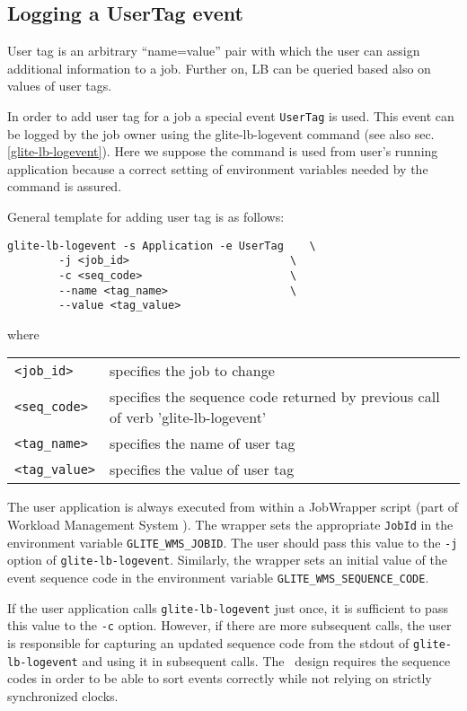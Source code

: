 \subsection{Logging a UserTag event}
\label{log_usertag}

User tag is an arbitrary ``name=value'' pair with which the user can assign
additional information to a job. Further on, LB can be queried based also on
values of user tags.  %

In order to add user tag for a job a special event \verb'UserTag' is used. This
event can be logged by the job owner using the glite-lb-logevent command (see
also sec.\ref{glite-lb-logevent}). Here we suppose the command is used from
user's running application because a correct setting of environment variables
needed by the command is assured.

General template for adding user tag is as follows:

\begin{verbatim}
glite-lb-logevent -s Application -e UserTag    \
        -j <job_id>                         \
        -c <seq_code>                       \
        --name <tag_name>                   \
        --value <tag_value>
\end{verbatim}

where

\begin{tabularx}{\textwidth}{lX}
\verb'<job_id>'    & specifies the job to change \\
\verb'<seq_code>'  & specifies the sequence code returned by previous call
			of verb 'glite-lb-logevent' \\
\verb'<tag_name>'  & specifies the name of user tag \\
\verb'<tag_value>' & specifies the value of user tag \\
\end{tabularx}

The user application is always executed from within a JobWrapper script (part
of Workload Management System \cite{jgc}). The wrapper  sets the  appropriate
\verb'JobId' in the environment variable \verb'GLITE_WMS_JOBID'. The user
should pass this value to the \verb'-j' option of \verb'glite-lb-logevent'.
Similarly, the wrapper sets an initial value of the event sequence code in the
environment variable \verb'GLITE_WMS_SEQUENCE_CODE'.

If the user application calls \verb'glite-lb-logevent' just once, it is
sufficient to pass this value to the \verb'-c' option.  However, if there are
more  subsequent calls,  the  user is responsible for capturing an updated
sequence code from the stdout of \verb'glite-lb-logevent' and using it in
subsequent calls. The \LB\ design requires the sequence codes in  order  to be
able to sort events correctly while not relying on strictly synchronized
clocks.  

